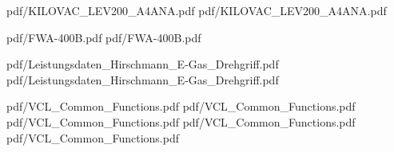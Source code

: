  {pdf/KILOVAC_LEV200_A4ANA.pdf}
 {pdf/KILOVAC_LEV200_A4ANA.pdf}

 {pdf/FWA-400B.pdf}
 {pdf/FWA-400B.pdf}

 {pdf/Leistungsdaten_Hirschmann_E-Gas_Drehgriff.pdf}
 {pdf/Leistungsdaten_Hirschmann_E-Gas_Drehgriff.pdf}

 {pdf/VCL_Common_Functions.pdf}
 {pdf/VCL_Common_Functions.pdf}
 {pdf/VCL_Common_Functions.pdf}
 {pdf/VCL_Common_Functions.pdf}
 {pdf/VCL_Common_Functions.pdf}